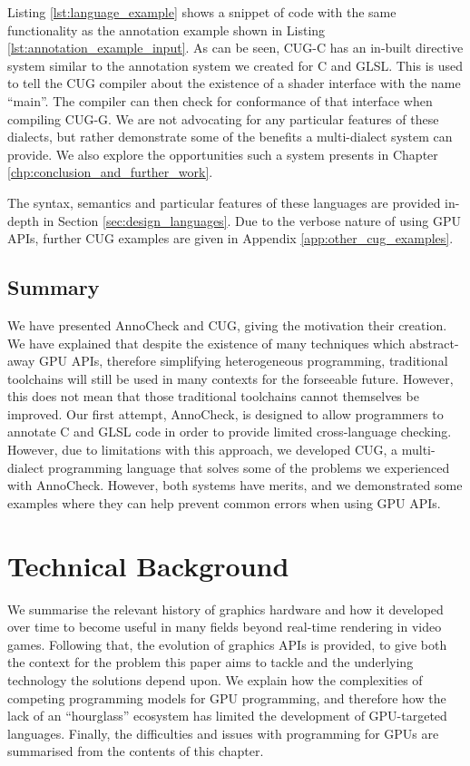 \documentclass[a4paper,12pt,twoside,openright]{report}
\begin{document}
Listing \ref{lst:language_example} shows a snippet of code with the same
functionality as the annotation example shown in Listing
\ref{lst:annotation_example_input}. As can be seen, CUG-C has an in-built
directive system similar to the annotation system we created for C and GLSL.
This is used to tell the CUG compiler about the existence of a shader interface
with the name ``main''. The compiler can then check for conformance of that
interface when compiling CUG-G. We are not advocating for any particular
features of these dialects, but rather demonstrate some of the benefits a
multi-dialect system can provide. We also explore the opportunities such a
system presents in Chapter \ref{chp:conclusion_and_further_work}.

The syntax, semantics and particular features of these languages are provided
in-depth in Section \ref{sec:design_languages}. Due to the verbose nature of
using GPU APIs, further CUG examples are given in Appendix
\ref{app:other_cug_examples}.

\section{Summary}

We have presented AnnoCheck and CUG, giving the motivation their creation. We
have explained that despite the existence of many techniques which
abstract-away GPU APIs, therefore simplifying heterogeneous programming,
traditional toolchains will still be used in many contexts for the forseeable
future. However, this does not mean that those traditional toolchains cannot
themselves be improved. Our first attempt, AnnoCheck, is designed to allow
programmers to annotate C and GLSL code in order to provide limited
cross-language checking. However, due to limitations with this approach, we
developed CUG, a multi-dialect programming language that solves some of the
problems we experienced with AnnoCheck. However, both systems have merits, and we
demonstrated some examples where they can help prevent common errors when using
GPU APIs.

\chapter{Technical Background}

\label{chp:technical_background}

We summarise the relevant history of graphics hardware and how it developed
over time to become useful in many fields beyond real-time rendering in video
games. Following that, the evolution of graphics APIs is provided, to give both
the context for the problem this paper aims to tackle and the underlying
technology the solutions depend upon. We explain how the complexities of
competing programming models for GPU programming, and therefore how the lack of
an ``hourglass'' ecosystem has limited the development of GPU-targeted
languages. Finally, the difficulties and issues with programming for GPUs are
summarised from the contents of this chapter.
\end{document}
